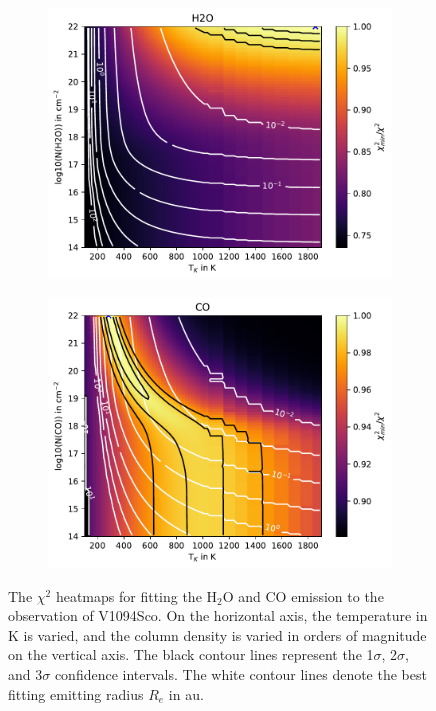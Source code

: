 \documentclass[oneside, single, authoryear, semicolon, 12pt]{lion-msc}
\newcommand{\4}{$_4$}
\newcommand{\3}{$_3$}
\newcommand{\2}{$_2$}
\begin{document}
\begin{figure}[!ht]
    \centering
    \begin{subfigure}[b]{0.49\textwidth}
        \centering
        \includegraphics[width=\textwidth]{radexpy_niels/Radexpy_for_Niels/chi2_map_H2O_V1094Sco.pdf}
    \end{subfigure}
    \hfill
    \begin{subfigure}[b]{0.49\textwidth}
        \centering
        \includegraphics[width=\textwidth]{radexpy_niels/Radexpy_for_Niels/chi2_map_CO_V1094Sco.pdf}
    \end{subfigure}
    \caption{The $\chi^2$ heatmaps for fitting the H\2O and CO emission to the observation of V1094Sco. On the horizontal axis, the temperature in K is varied, and the column density is varied in orders of magnitude on the vertical axis. The black contour lines represent the 1$\sigma$, 2$\sigma$, and 3$\sigma$ confidence intervals. The white contour lines denote the best fitting emitting radius $R_e$ in au.}
\end{figure}
\end{document}
